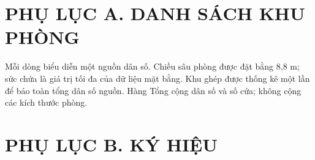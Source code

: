 \newcommand{\appendixtables}[1]{%
\setcounter{table}{0}%
\renewcommand{\thetable}{#1.\arabic{table}}%
\renewcommand{\theHtable}{appendix.#1.\arabic{table}}%
}
\clearpage\appendixtables{A}\section*{PHỤ LỤC A. DANH SÁCH KHU PHÒNG}
Mỗi dòng biểu diễn một nguồn dân số. Chiều sâu phòng được đặt bằng 8,8 m; sức chứa là giá trị tối đa của dữ liệu mặt bằng. Khu ghép được thống kê một lần để bảo toàn tổng dân số nguồn. Hàng Tổng cộng dân số và số cửa; không cộng các kích thước phòng.

\clearpage\appendixtables{B}\section*{PHỤ LỤC B. KÝ HIỆU}
\begingroup\fontsize{12}{16}\selectfont
